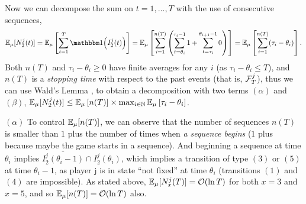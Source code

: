 \begin{smallproof}
  Now we can decompose the sum on $t=1,\dots,T$ with the use of consecutive sequences,
  \[
    \E_{\mu}[N_2^j(t)]
    = \E_{\mu}\left[ \sum_{t=1}^T \indic{\left(I_2^j(t)\right)} \right]
    =
    \E_{\mu}\left[ \sum_{i=1}^{n(T)} \left( \sum_{t=\theta_i}^{\tau_i - 1} 1 + \sum_{t=\tau_i}^{\theta_{i+1} - 1} 0 \right) \right]
    =
    \E_{\mu}\left[ \sum_{i=1}^{n(T)} (\tau_i - \theta_i) \right].
  \]
  Both $n(T)$ and $\tau_i - \theta_i \geq 0$ have finite averages for any $i$ (as $\tau_i - \theta_i \leq T$), and $n(T)$ is a \emph{stopping time} with respect to the past events (that is, $\mathcal{F}^j_T$),
  thus we can use Wald's Lemma \citep{Wald45},
  to obtain a decomposition with two terms $(\alpha)$ and $(\beta)$,
  $\mathbb{E}_{\mu}[N_2^j(t)] \leq \mathbb{E}_{\mu}\left[ n(T) \right] \times \max_{i\in\mathbb{N}} \mathbb{E}_{\mu}\left[ \tau_i - \theta_i \right]$.

  $(\alpha)$ To control $\mathbb{E}_{\mu}[n(T)]$, we can observe that
  the number of sequences $n(T)$ is smaller than $1$ plus the number of times when \emph{a sequence begins} ($1$ plus because maybe the game starts in a sequence).
  And beginning a sequence
  at time $\theta_i$ implies
  $\overline{I_2^j(\theta_i-1)} \cap I_2^j(\theta_i)$,
  which implies a transition of type $(3)$ or $(5)$ at time $\theta_i - 1$, as player j is in state ``not fixed'' at time $\theta_i$ (transitions $(1)$ and $(4)$ are impossible).
  As stated above, $\mathbb{E}_{\mu}[N_x^j(T)] = \mathop{}\mathopen{}\mathcal{O}\mathopen{}\left(\ln T\right)$ for both $x=3$ and $x=5$,
  and so $\mathbb{E}_{\mu}[n(T)] = \mathop{}\mathopen{}\mathcal{O}\mathopen{}\left(\ln T\right)$ also.



\end{smallproof}
